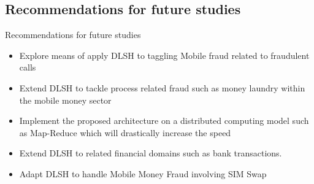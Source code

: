 \documentclass[11pt,aspectratio=169]{beamer}
\begin{document}
		\subsection{Recommendations for future studies}
		\begin{frame}
			\begin{block}{Recommendations for future studies}
				\begin{itemize}
					\item Explore means of apply DLSH to taggling Mobile fraud related to fraudulent calls
					
					\item Extend DLSH to tackle process related fraud such as money laundry within the mobile money sector
					
					\item Implement the proposed architecture on a distributed computing model such as Map-Reduce which will drastically increase the speed 
					
			
					\item Extend DLSH to related financial domains such as bank transactions.
					\item Adapt DLSH to handle Mobile Money Fraud involving SIM Swap
					
				\end{itemize}
			\end{block}
		\end{frame}
	
	
			
\end{document}
